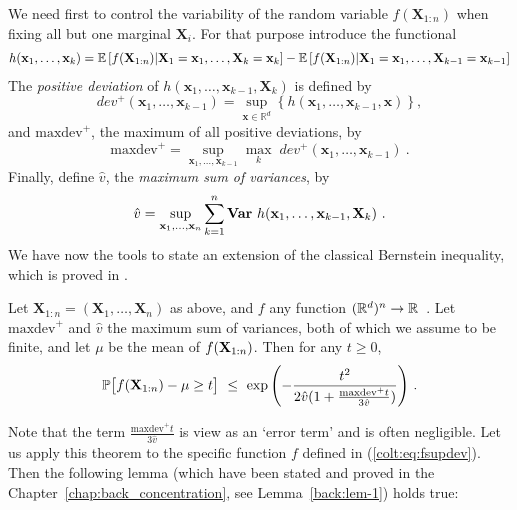 We need first to  control the variability of the random variable $f(\mathbf{X}_{1:n})$ when fixing all but one marginal $\mathbf{X}_i$. For that purpose introduce the functional
\begin{align*}
h(\mathbf{x}_1,\ldots,\mathbf{x}_k) = \mathbb{E}\left [ f(\mathbf X_{1:n}) | \mathbf{X}_1=\mathbf{x}_1,\ldots,\mathbf{X}_k=\mathbf{x}_k \right] - \mathbb{E}\left [ f(\mathbf X_{1:n}) | \mathbf{X}_1=\mathbf{x}_1,\ldots,\mathbf{X}_{k-1}=\mathbf{x}_{k-1} \right]
\end{align*}
The \emph{positive deviation} of
$h(\mathbf{x}_1,\ldots,\mathbf{x}_{k-1},\mathbf{X}_k)$ is defined by 
\[dev^+(\mathbf{x}_1,\ldots,\mathbf{x}_{k-1})= \sup_{\mathbf{x} \in
  \mathbb{R}^d} \left \{
  h(\mathbf{x}_1,\ldots,\mathbf{x}_{k-1},\mathbf{x})\right \}, \]
 and $\text{maxdev}^+$, the maximum of all positive deviations, by 
 \[\text{maxdev}^+ = \sup_{\mathbf{x}_1,\ldots,\mathbf{x}_{k-1}} \max_{k}\;
 dev^+(\mathbf{x}_1,\ldots,\mathbf{x}_{k-1})~.\] %
 Finally,  define $\hat v $, the \emph{maximum sum of
 variances}, by $$\hat v = \sup_{\mathbf{x}_1,\ldots,\mathbf{x}_n}
 \sum_{k=1}^{n} \mathbf{Var}~ h(\mathbf{x}_1,\ldots,\mathbf{x}_{k-1}, \mathbf X_k)~.$$ We have
 now the tools to state an extension of the classical Bernstein
 inequality, which is proved in \cite{McDiarmid98}.
\begin{proposition}
\label{colt:thm-berstein}
Let $\mathbf{X}_{1:n} = (\mathbf{X}_1,\ldots,\mathbf{X}_n)$ %
as above, and $f$ any function $(\mathbb R^d)^n\to \mathbb R$~.  Let $\text{maxdev}^+$
and $\hat v$ the maximum sum of variances, both of which we assume to
be finite, and let $\mu$ be the mean of $f(\mathbf X_{1:n})$. Then for any $t \ge 0$,
\begin{align*}
\mathbb{P} \big[ f(\mathbf X_{1:n}) - \mu \ge t \big] ~\le~ \exp{\left(- \frac{t^2}{2 \hat v (1 + \frac{\text{maxdev}^+ t}{3 \hat v}) }\right)}~.
\end{align*}
\end{proposition}
\noindent
Note that the term $\frac{\text{maxdev}^+ t}{3 \hat v}$ is view as an `error
term' and is often negligible. Let us apply this theorem to the
specific  function $f$ defined in (\ref{colt:eq:fsupdev}).  
Then the following lemma (which have been stated and proved in the Chapter~\ref{chap:back_concentration}, see Lemma~\ref{back:lem-1}) holds true:

